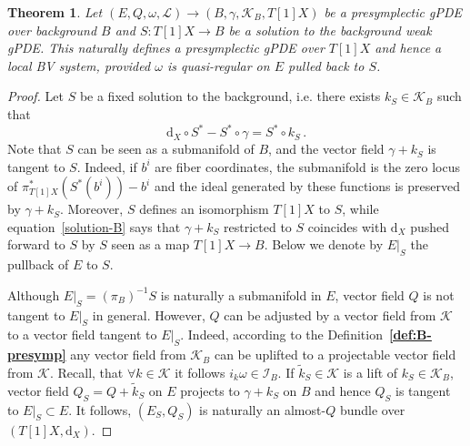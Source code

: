 \documentclass[a4paper,12pt]{article}
\numberwithin{equation}{section} %
\newtheorem{theorem}[thm]{\textbf{Theorem}}
\renewcommand{\tilde}{\widetilde}
\newcommand{\bref}[1]{\textbf{\ref{#1}}}
\newcommand{\dx}{\mathrm{d}_X}
\def\cI{\mathcal{I}}
\def\cK{\mathcal{K}}
\def\cL{\mathcal{L}}
\begin{document}
\begin{theorem}
Let  $(E,Q,\omega, \cL) \to (B,\gamma, \cK_B,T[1]X)$ be a  presymplectic gPDE over background $B$ and
$S: T[1]X \rightarrow B$ be a solution to the background weak gPDE. This naturally defines a presymplectic gPDE over $T[1]X$ and hence a local BV system, provided $\omega$ is quasi-regular
on $E$ pulled back to $S$.
\end{theorem}
\begin{proof}
    Let $S$ be a fixed solution to the background, i.e.
    there exists $k_S \in \cK_B$ such that  
    \begin{equation}
    \label{solution-B}
        \dx \circ S^* -S^*\circ \gamma = S^*\circ k_S\,.
    \end{equation}
    Note that $S$ can be seen as a submanifold of $B$, and the vector field $\gamma + k_S$ is tangent to $S$. Indeed, if $b^i$ are fiber coordinates, the submanifold is the zero locus of $\pi_{T[1]X}^*(S^*(b^i)) - b^i$ and the ideal generated by these functions is preserved by $\gamma + k_S$.
    Moreover, $S$ defines an isomorphism $T[1]X$ to $S$, while
    equation~\eqref{solution-B} says that $\gamma + k_S$ restricted to $S$ coincides with $\dx$ pushed forward to $S$
    by $S$ seen as a map $T[1]X\to B$. Below we denote by $E|_S$  the pullback of $E$  to $S$.
    

    Although $E|_S=(\pi_B)^{-1}S$ is naturally a submanifold in $E$, vector field $Q$ is not tangent to $E|_S$ in general. However, $Q$ can be adjusted by a vector field from $\cK$ to a vector field tangent to $E|_{S}$. Indeed, according to the Definition~\bref{def:B-presymp} any vector field from $\cK_B$ can be uplifted to a projectable vector field from $\cK$. Recall, that $\forall k \in \cK$ it follows $i_k\omega\in \cI_B$. If 
$\tilde k_S \in \cK$ is a lift of $k_S\in \cK_B$, vector field $Q_S=Q+\tilde{k}_S$ on $E$ projects to $\gamma+k_S$ on $B$ and hence $Q_S$ is tangent to $E|_{S}\subset E$. It follows, $(E_S,Q_S)$ is naturally an almost-$Q$ bundle over $(T[1]X,\dx)$.



\end{proof}
\end{document}
